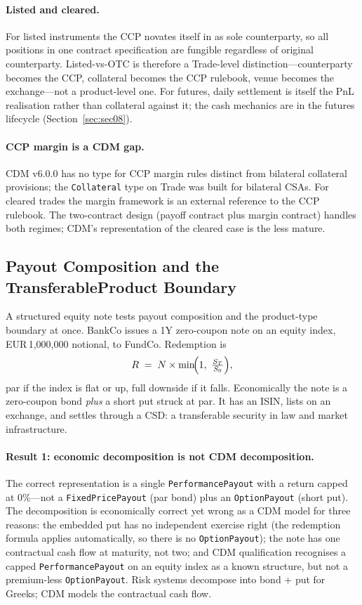 \paragraph{Listed and cleared.} For listed instruments the CCP novates itself in as sole counterparty, so all positions in one contract specification are fungible regardless of original counterparty. Listed-vs-OTC is therefore a Trade-level distinction---counterparty becomes the CCP, collateral becomes the CCP rulebook, venue becomes the exchange---not a product-level one. For futures, daily settlement is itself the PnL realisation rather than collateral against it; the cash mechanics are in the futures lifecycle (Section~\ref{sec:sec08}).

\paragraph{CCP margin is a CDM gap.} CDM v6.0.0 has no type for CCP margin rules distinct from bilateral collateral provisions; the \texttt{Collateral} type on Trade was built for bilateral CSAs. For cleared trades the margin framework is an external reference to the CCP rulebook. The two-contract design (payoff contract plus margin contract) handles both regimes; CDM's representation of the cleared case is the less mature.

\subsection{Payout Composition and the TransferableProduct Boundary}
\label{sec:cdm-structured-note}

A structured equity note tests payout composition and the product-type boundary at once. BankCo issues a 1Y zero-coupon note on an equity index, EUR\,1{,}000{,}000 notional, to FundCo. Redemption is
\[
R \;=\; N \times \min\!\Bigl(1,\ \tfrac{S_T}{S_0}\Bigr),
\]
par if the index is flat or up, full downside if it falls. Economically the note is a zero-coupon bond \emph{plus} a short put struck at par. It has an ISIN, lists on an exchange, and settles through a CSD: a transferable security in law and market infrastructure.

\paragraph{Result 1: economic decomposition is not CDM decomposition.} The correct representation is a single \texttt{PerformancePayout} with a return capped at 0\%---not a \texttt{FixedPricePayout} (par bond) plus an \texttt{OptionPayout} (short put). The decomposition is economically correct yet wrong as a CDM model for three reasons: the embedded put has no independent exercise right (the redemption formula applies automatically, so there is no \texttt{OptionPayout}); the note has one contractual cash flow at maturity, not two; and CDM qualification recognises a capped \texttt{PerformancePayout} on an equity index as a known structure, but not a premium-less \texttt{OptionPayout}. Risk systems decompose into bond + put for Greeks; CDM models the contractual cash flow.

